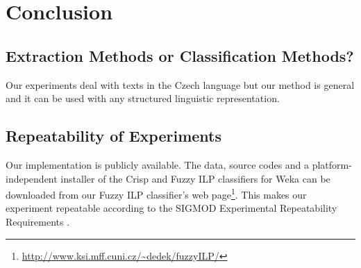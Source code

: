 \chapter{Conclusion} \label{sec:ch_conclusion}

\section{Extraction Methods or Classification Methods?}


Our experiments deal with texts in the Czech language but our method is general and it can be used with any structured linguistic representation. 

\section{Repeatability of Experiments} \label{sec:ch90_repeatablity}


Our implementation is publicly available. The data, source codes and a platform-independent installer of the Crisp and Fuzzy ILP classifiers for Weka can be downloaded from our Fuzzy ILP classifier's web page\footnote{\url{http://www.ksi.mff.cuni.cz/~dedek/fuzzyILP/}}. This makes our experiment repeatable according to the
SIGMOD Experimental Repeatability Requirements \citep{biblio:SIGMODrepeatability}.
